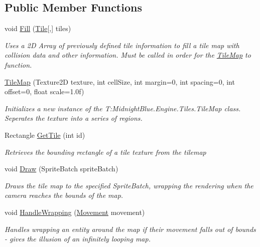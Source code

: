 \subsection*{Public Member Functions}
\begin{DoxyCompactItemize}
\item 
void \hyperlink{class_midnight_blue_1_1_engine_1_1_tiles_1_1_tile_map_ab2ae5b8ef2fb44d5267b8be7997ddb4c}{Fill} (\hyperlink{class_midnight_blue_1_1_tile}{Tile}\mbox{[},\mbox{]} tiles)
\begin{DoxyCompactList}\small\item\em Uses a 2D Array of previously defined tile information to fill a tile map with collision data and other information. Must be called in order for the \hyperlink{class_midnight_blue_1_1_engine_1_1_tiles_1_1_tile_map}{Tile\+Map} to function. \end{DoxyCompactList}\item 
\hyperlink{class_midnight_blue_1_1_engine_1_1_tiles_1_1_tile_map_a1baa1f61cadd4e7086514d70604f1025}{Tile\+Map} (Texture2D texture, int cell\+Size, int margin=0, int spacing=0, int offset=0, float scale=1.\+0f)
\begin{DoxyCompactList}\small\item\em Initializes a new instance of the T\+:\+Midnight\+Blue.\+Engine.\+Tiles.\+Tile\+Map class. Seperates the texture into a series of regions. \end{DoxyCompactList}\item 
Rectangle \hyperlink{class_midnight_blue_1_1_engine_1_1_tiles_1_1_tile_map_ae4d1521e4d80f255fb926141378966ca}{Get\+Tile} (int id)
\begin{DoxyCompactList}\small\item\em Retrieves the bounding rectangle of a tile texture from the tilemap \end{DoxyCompactList}\item 
void \hyperlink{class_midnight_blue_1_1_engine_1_1_tiles_1_1_tile_map_a5114eb9087f448be67b146f40245e7ee}{Draw} (Sprite\+Batch sprite\+Batch)
\begin{DoxyCompactList}\small\item\em Draws the tile map to the specified Sprite\+Batch, wrapping the rendering when the camera reaches the bounds of the map. \end{DoxyCompactList}\item 
void \hyperlink{class_midnight_blue_1_1_engine_1_1_tiles_1_1_tile_map_a503a61faaa4edd93bfa18258785726ec}{Handle\+Wrapping} (\hyperlink{class_midnight_blue_1_1_engine_1_1_entity_component_1_1_movement}{Movement} movement)
\begin{DoxyCompactList}\small\item\em Handles wrapping an entity around the map if their movement falls out of bounds -\/ gives the illusion of an infinitely looping map. \end{DoxyCompactList}\end{DoxyCompactItemize}
